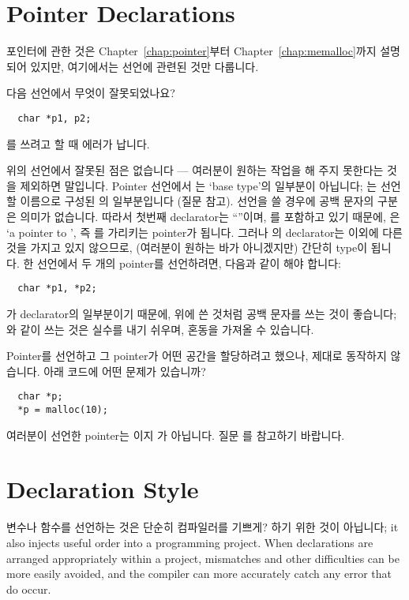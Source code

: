 \section{Pointer Declarations}	\label{sec:pointerdec}
포인터에 관한 것은 Chapter~\ref{chap:pointer}부터
Chapter~\ref{chap:memalloc}까지
설명되어 있지만, 여기에서는 선언에 관련된 것만 다룹니다.

\begin{faq}
	다음 선언에서 무엇이 잘못되었나요?
\begin{verbatim}
  char *p1, p2;
\end{verbatim}
	를 쓰려고 할 때 에러가 납니다.

\A
	위의 선언에서 잘못된 점은 없습니다 --- 여러분이 원하는 작업을
	해 주지 못한다는 것을 제외하면 말입니다.
	Pointer 선언에서 \TT{*}는 `base type'의 일부분이 아닙니다;
	\TT{*}는 선언할 이름으로 구성된 의 일부분입니다
	(질문  참고).  선언을 쓸 경우에 공백 문자의 구분은 의미가
	없습니다.  따라서 첫번째 declarator는 ``''이며,
	\TT{*}를 포함하고 있기 때문에, 은 `a pointer to ',
	즉 를 가리키는 pointer가 됩니다.
	그러나 의 declarator는  이외에 다른 것을 가지고
	있지 않으므로, (여러분이 원하는 바가 아니겠지만) 간단히 
	 type이 됩니다.  한 선언에서 두 개의 pointer를 선언하려면,
	다음과 같이 해야 합니다:

\begin{verbatim}
  char *p1, *p2;
\end{verbatim}

	\TT{*}가 declarator의 일부분이기 때문에, 위에 쓴 것처럼 공백 문자를
	쓰는 것이 좋습니다; 와 같이 쓰는 것은 실수를 내기 쉬우며,
	혼동을 가져올 수 있습니다.

\end{faq}

\begin{faq}
	Pointer를 선언하고 그 pointer가 어떤 공간을 할당하려고 했으나,
	제대로 동작하지 않습니다.  아래 코드에 어떤 문제가 있습니까?
\begin{verbatim}
  char *p;
  *p = malloc(10);
\end{verbatim}

\A
	여러분이 선언한 pointer는 이지 가 아닙니다.
	질문 를 참고하기 바랍니다.
\end{faq}
	
\section{Declaration Style}	\label{sec:decstyle}
변수나 함수를 선언하는 것은 단순히 컴파일러를 기쁘게? 하기 위한 것이
아닙니다; it also injects useful order into a programming project.
When declarations are arranged appropriately within a project, mismatches
and other difficulties can be more easily avoided, and the compiler
can more accurately catch any error that do occur.

